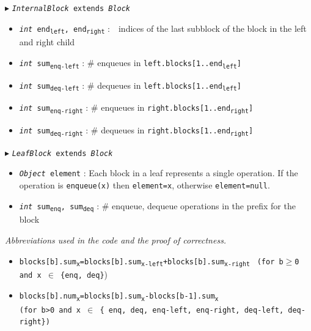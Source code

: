 \documentclass[10pt]{article}
\newcommand{\sub}[1]{\textsubscript{#1}}
\renewcommand{\tt}[1]{\texttt{#1}}
\renewcommand{\sl}[1]{\textsl{#1}}
\renewcommand{\it}[1]{\textit{#1}}
\theoremstyle{definition}
\begin{document}
\begin{algorithm}
\begin{algorithmic}[1]
\begin{multicols}{2}
\Statex $\blacktriangleright$ \tt{\sl{InternalBlock} extends \sl{Block}}
\begin{itemize}
    \item \tt{\sl{int} end\sub{left}, end\sub{right}}
  \textsf{:~~indices of the last subblock of the block in the left and right child}
  \item \tt{\sl{int} sum\sub{enq-left}}
  \textsf{: \# enqueues in \tt{left.blocks[1..end\sub{left}]}}
  \item \tt{\sl{int} sum\sub{deq-left}}
  \textsf{: \# dequeues in \tt{left.blocks[1..end\sub{left}]}}
  \item \tt{\sl{int} sum\sub{enq-right}}
  \textsf{: \# enqueues in \tt{right.blocks[1..end\sub{right}]}}
  \item \tt{\sl{int} sum\sub{deq-right}}
  \textsf{: \# dequeues in \tt{right.blocks[1..end\sub{right}]}}
\end{itemize}

\Statex $\blacktriangleright$ \tt{\sl{LeafBlock} extends \sl{Block}}
\begin{itemize}
  \item \tt{\sl{Object} element}
  \textsf{: Each block in a leaf represents a single operation. If the operation is \tt{enqueue(x)} then \tt{element=x}, otherwise \tt{element=null}.}
  
    \item \tt{\sl{int} sum\sub{enq}, sum\sub{deq}}
  \textsf{: \# enqueue, dequeue operations in the prefix for the block}
\end{itemize}

\end{multicols}
\end{algorithmic}
\end{algorithm}

\begin{footnotesize}

\it{Abbreviations used in the code and the proof of correctness.}
\begin{itemize}
 \item \tt{blocks[b].sum\sub{x}=blocks[b].sum\sub{x-left}+blocks[b].sum\sub{x-right}}  \tt{ (for b$\geq$0 and x $\in$ \{enq, deq\}})
  \item \tt{blocks[b].num\sub{x}=blocks[b].sum\sub{x}-blocks[b-1].sum\sub{x}} \\ \tt{(for b>0 and x $\in$ \{ enq, deq, enq-left, enq-right, deq-left, deq-right\})}
\end{itemize}
\end{footnotesize}
\end{document}
